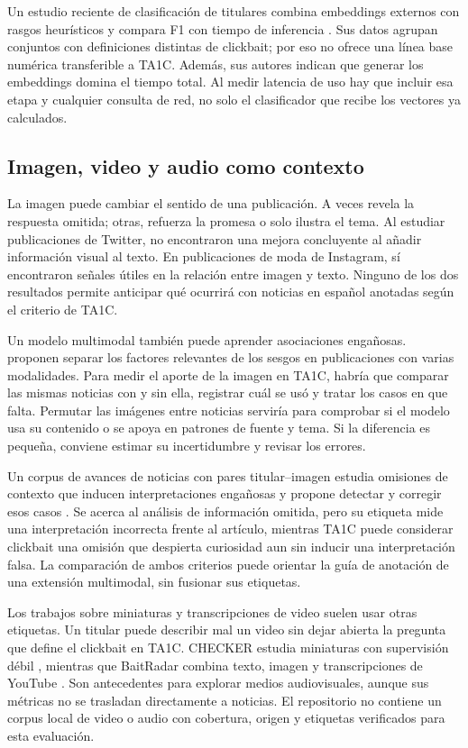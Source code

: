 Un estudio reciente de clasificación de titulares combina embeddings externos con rasgos heurísticos y compara F1 con tiempo de inferencia \citep{kuntur2026quick}. Sus datos agrupan conjuntos con definiciones distintas de clickbait; por eso no ofrece una línea base numérica transferible a TA1C. Además, sus autores indican que generar los embeddings domina el tiempo total. Al medir latencia de uso hay que incluir esa etapa y cualquier consulta de red, no solo el clasificador que recibe los vectores ya calculados.

\subsection{Imagen, video y audio como contexto}
\label{sec:multimodal}

La imagen puede cambiar el sentido de una publicación. A veces revela la respuesta omitida; otras, refuerza la promesa o solo ilustra el tema. Al estudiar publicaciones de Twitter, \citet{glenski2017} no encontraron una mejora concluyente al añadir información visual al texto. En publicaciones de moda de Instagram, \citet{ha2018} sí encontraron señales útiles en la relación entre imagen y texto. Ninguno de los dos resultados permite anticipar qué ocurrirá con noticias en español anotadas según el criterio de TA1C.

Un modelo multimodal también puede aprender asociaciones engañosas. \citet{yu2024} proponen separar los factores relevantes de los sesgos en publicaciones con varias modalidades. Para medir el aporte de la imagen en TA1C, habría que comparar las mismas noticias con y sin ella, registrar cuál se usó y tratar los casos en que falta. Permutar las imágenes entre noticias serviría para comprobar si el modelo usa su contenido o se apoya en patrones de fuente y tema. Si la diferencia es pequeña, conviene estimar su incertidumbre y revisar los errores.

Un corpus de avances de noticias con pares titular--imagen estudia omisiones de contexto que inducen interpretaciones engañosas y propone detectar y corregir esos casos \citep{li2026omissions}. Se acerca al análisis de información omitida, pero su etiqueta mide una interpretación incorrecta frente al artículo, mientras TA1C puede considerar clickbait una omisión que despierta curiosidad aun sin inducir una interpretación falsa. La comparación de ambos criterios puede orientar la guía de anotación de una extensión multimodal, sin fusionar sus etiquetas.

Los trabajos sobre miniaturas y transcripciones de video suelen usar otras etiquetas. Un titular puede describir mal un video sin dejar abierta la pregunta que define el clickbait en TA1C. CHECKER estudia miniaturas con supervisión débil \citep{xie2021}, mientras que BaitRadar combina texto, imagen y transcripciones de YouTube \citep{gamage2021}. Son antecedentes para explorar medios audiovisuales, aunque sus métricas no se trasladan directamente a noticias. El repositorio no contiene un corpus local de video o audio con cobertura, origen y etiquetas verificados para esta evaluación.

